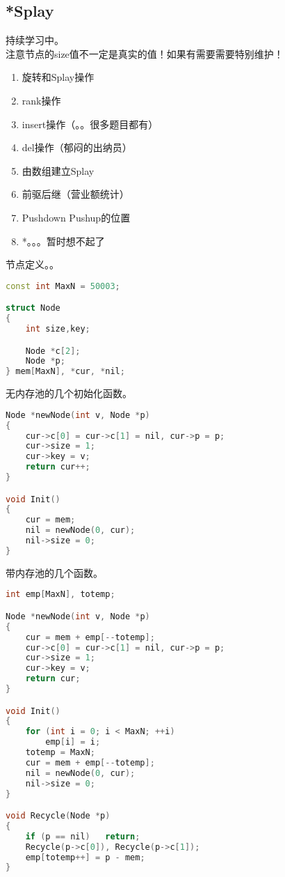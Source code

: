 \subsection{*Splay}
    持续学习中。\\
    注意节点的size值不一定是真实的值！如果有需要需要特别维护！\\
    \begin{enumerate}
      \item 旋转和Splay操作
      \item rank操作
      \item insert操作（。。很多题目都有）
      \item del操作（郁闷的出纳员）
      \item 由数组建立Splay
      \item 前驱后继（营业额统计）
      \item Pushdown Pushup的位置
      \item *。。。暂时想不起了
    \end{enumerate}
    节点定义。。\\
    \begin{lstlisting}[language=c++]
const int MaxN = 50003;

struct Node
{
    int size,key;

    Node *c[2];
    Node *p;
} mem[MaxN], *cur, *nil;
    \end{lstlisting}
    无内存池的几个初始化函数。\\
    \begin{lstlisting}[language=c++]
Node *newNode(int v, Node *p)
{
    cur->c[0] = cur->c[1] = nil, cur->p = p;
    cur->size = 1;
    cur->key = v;
    return cur++;
}

void Init()
{
    cur = mem;
    nil = newNode(0, cur);
    nil->size = 0;
}
    \end{lstlisting}
    带内存池的几个函数。\\
    \begin{lstlisting}[language=c++]
int emp[MaxN], totemp;

Node *newNode(int v, Node *p)
{
    cur = mem + emp[--totemp];
    cur->c[0] = cur->c[1] = nil, cur->p = p;
    cur->size = 1;
    cur->key = v;
    return cur;
}

void Init()
{
    for (int i = 0; i < MaxN; ++i)
        emp[i] = i;
    totemp = MaxN;
    cur = mem + emp[--totemp];
    nil = newNode(0, cur);
    nil->size = 0;
}

void Recycle(Node *p)
{
    if (p == nil)   return;
    Recycle(p->c[0]), Recycle(p->c[1]);
    emp[totemp++] = p - mem;
}
    \end{lstlisting}
